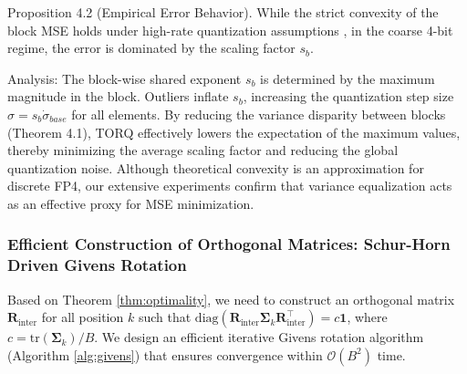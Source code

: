 

Proposition 4.2 (Empirical Error Behavior). While the strict convexity of the block MSE holds under high-rate quantization assumptions \cite{zamir}, in the coarse 4-bit regime, the error is dominated by the scaling factor $s_b$.

Analysis: The block-wise shared exponent $s
_b$ is determined by the maximum magnitude in the block. Outliers inflate $s_b$, increasing the quantization step size $\sigma=s_b \dot \sigma_{base}$
for all elements. By reducing the variance disparity between blocks (Theorem 4.1), TORQ effectively lowers the expectation of the maximum values, thereby minimizing the average scaling factor and reducing the global quantization noise. Although theoretical convexity is an approximation for discrete FP4, our extensive experiments confirm that variance equalization acts as an effective proxy for MSE minimization.

\subsubsection{Efficient Construction of Orthogonal Matrices: Schur-Horn Driven Givens Rotation}

Based on Theorem \ref{thm:optimality}, we need to construct an orthogonal matrix $\mathbf{R}_{\text{inter}}$ for all position $k$ such that $\mathrm{diag}(\mathbf{R}_{\text{inter}}\boldsymbol{\Sigma}_k\mathbf{R}^\top_{\text{inter}}) = c\mathbf{1}$, where $c=\mathrm{tr}(\boldsymbol{\Sigma}_k)/B$. We design an efficient iterative Givens rotation algorithm (Algorithm \ref{alg:givens}) that ensures convergence within $\mathcal{O}(B^2)$ time.

